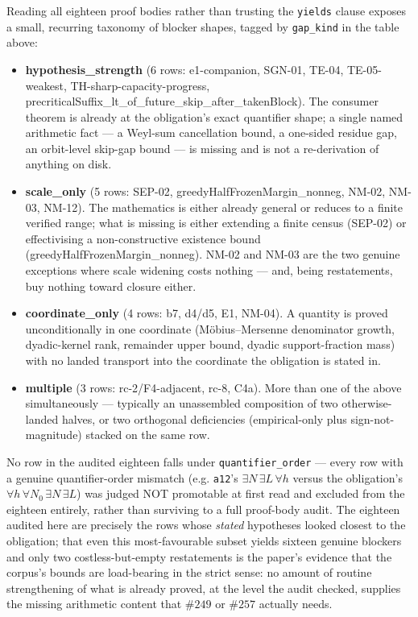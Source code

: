 Reading all eighteen proof bodies rather than trusting the \texttt{yields}
clause exposes a small, recurring taxonomy of blocker shapes, tagged by
\texttt{gap\_kind} in the table above:

\begin{itemize}[nosep]
\item \textbf{hypothesis\_strength} (6 rows: e1-companion, SGN-01, TE-04,
TE-05-weakest, TH-sharp-capacity-progress,
precriticalSuffix\_lt\_of\_future\_skip\_after\_takenBlock). The consumer
theorem is already at the obligation's exact quantifier shape; a single
named arithmetic fact — a Weyl-sum cancellation bound, a one-sided residue
gap, an orbit-level skip-gap bound — is missing and is not a re-derivation
of anything on disk.
\item \textbf{scale\_only} (5 rows: SEP-02, greedyHalfFrozenMargin\_nonneg,
NM-02, NM-03, NM-12). The mathematics is either already general or reduces
to a finite verified range; what is missing is either extending a finite
census (SEP-02) or effectivising a non-constructive existence bound
(greedyHalfFrozenMargin\_nonneg). NM-02 and NM-03 are the two genuine
exceptions where scale widening costs nothing — and, being restatements, buy
nothing toward closure either.
\item \textbf{coordinate\_only} (4 rows: b7, d4/d5, E1, NM-04). A quantity
is proved unconditionally in one coordinate (Möbius--Mersenne denominator
growth, dyadic-kernel rank, remainder upper bound, dyadic support-fraction
mass) with no landed transport into the coordinate the obligation is stated
in.
\item \textbf{multiple} (3 rows: rc-2/F4-adjacent, rc-8, C4a). More than
one of the above simultaneously — typically an unassembled composition of
two otherwise-landed halves, or two orthogonal deficiencies (empirical-only
plus sign-not-magnitude) stacked on the same row.
\end{itemize}

No row in the audited eighteen falls under \texttt{quantifier\_order} — every
row with a genuine quantifier-order mismatch (e.g. \texttt{a12}'s
\(\exists N\,\exists L\,\forall h\) versus the obligation's
\(\forall h\,\forall N_0\,\exists N\,\exists L\)) was judged NOT promotable
at first read and excluded from the eighteen entirely, rather than surviving
to a full proof-body audit. The eighteen audited here are precisely the rows
whose \emph{stated} hypotheses looked closest to the obligation; that even
this most-favourable subset yields sixteen genuine blockers and only two
costless-but-empty restatements is the paper's evidence that the corpus's
bounds are load-bearing in the strict sense: no amount of routine
strengthening of what is already proved, at the level the audit checked,
supplies the missing arithmetic content that \(\#249\) or \(\#257\)
actually needs.
